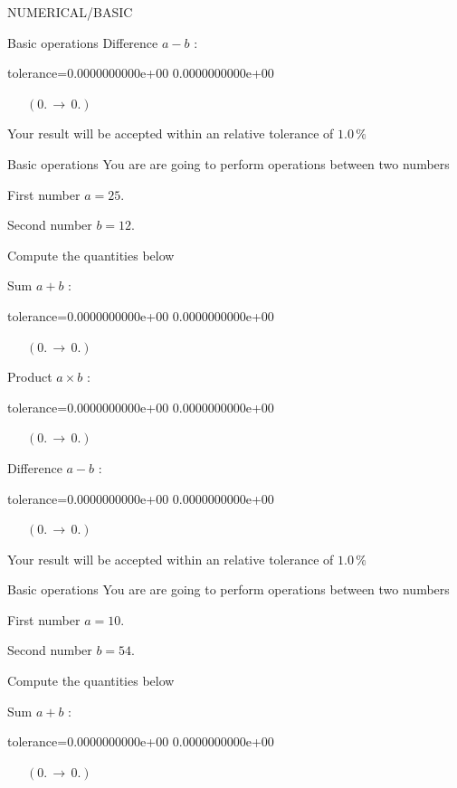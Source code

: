 \documentclass[12pt]{article}
\begin{document}
\begin{quiz}{NUMERICAL/BASIC}
\begin{cloze}{Basic operations}
Difference $ a - b $ : 
\begin{numerical}[points=1] 
\item[tolerance={0.0000000000e+00}] 0.0000000000e+00 
\end{numerical} 
 $\,$ 
 $ \quad (0. \, \rightarrow \, 0.) $ 

Your result will be accepted within an relative tolerance of $1.0\, \% $

\end{cloze} 


 \begin{cloze}{Basic operations} 
You are are going to perform operations between two numbers

First number $a = 25.\, $

Second number $b = 12.\, $

 

Compute the quantities below

Sum $ a + b $ : 
\begin{numerical}[points=1] 
\item[tolerance={0.0000000000e+00}] 0.0000000000e+00 
\end{numerical} 
 $\,$ 
 $ \quad (0. \, \rightarrow \, 0.) $ 

Product $ a \times b $ : 
\begin{numerical}[points=1] 
\item[tolerance={0.0000000000e+00}] 0.0000000000e+00 
\end{numerical} 
 $\,$ 
 $ \quad (0. \, \rightarrow \, 0.) $ 

Difference $ a - b $ : 
\begin{numerical}[points=1] 
\item[tolerance={0.0000000000e+00}] 0.0000000000e+00 
\end{numerical} 
 $\,$ 
 $ \quad (0. \, \rightarrow \, 0.) $ 

Your result will be accepted within an relative tolerance of $1.0\, \% $

\end{cloze} 


 \begin{cloze}{Basic operations} 
You are are going to perform operations between two numbers

First number $a = 10.\, $

Second number $b = 54.\, $

 

Compute the quantities below

Sum $ a + b $ : 
\begin{numerical}[points=1] 
\item[tolerance={0.0000000000e+00}] 0.0000000000e+00 
\end{numerical} 
 $\,$ 
 $ \quad (0. \, \rightarrow \, 0.) $ 


\end{cloze}
\end{quiz}
\end{document}
